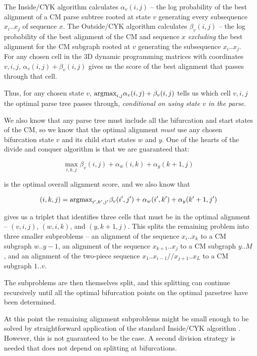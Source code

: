 \documentclass[11pt]{article}
\begin{document}
The Inside/CYK algorithm calculates $\alpha_v(i,j)$ -- the log
probability of the best alignment of a CM parse subtree rooted at
state $v$ generating every subsequence $x_i..x_j$ of sequence $x$.
The Outside/CYK algorithm calculates $\beta_v(i,j)$ -- the log
probability of the best alignment of the CM and sequence $x$
\emph{excluding} the best alignment for the CM subgraph rooted at $v$
generating the subsequence $x_i..x_j$.  For any chosen cell in the 3D
dynamic programming matrices with coordinates $v,i,j$, $\alpha_v(i,j)
+ \beta_v(i,j)$ gives us the score of the best alignment that passes
through that cell. 

Thus, for any chosen state $v$, $\mbox{\rm{argmax}}_{i,j} \alpha_{v}(i,j) +
\beta_{v}(i,j)$ tells us which cell $v,i,j$ the optimal parse tree
passes through, \emph{conditional on using state $v$ in the parse}.

We also know that any parse tree must include all the bifurcation and
start states of the CM, so we know that the optimal alignment
\emph{must} use any chosen bifurcation state $v$ and its child start
states $w$ and $y$. One of the hearts of the divide and conquer
algorithm is that we are guaranteed that:

\[
   \max_{i,k,j} \beta_{v}(i,j) + \alpha_{w}(i,k) + \alpha_{y}(k+1,j)
\]

is the optimal overall alignment score, and we also know that

\[
      (i,k,j) = \mbox{\rm{argmax}}_{i',k',j'}  \beta_{v}(i',j') +
      \alpha_{w}(i',k') + \alpha_{y}(k'+1,j') 
\]

gives us a triplet that identifies three cells that must be in the
optimal alignment -- $(v,i,j)$, $(w,i,k)$, and $(y,k+1,j)$. This
splits the remaining problem into three smaller subproblems -- an
alignment of the sequence $x_{i}..x_{k}$ to a CM subgraph $w..y-1$, an
alignment of the sequence $x_{k+1}..x_{j}$ to a CM subgraph $y..M$,
and an alignment of the two-piece sequence
$x_1..x_{i-1}//x_{j+1}..x_L$ to a CM subgraph $1..v$.

The subproblems are then themselves split, and this splitting can
continue recursively until all the optimal bifurcation points on the
optimal parsetree have been determined.

At this point the remaining alignment subproblems might be small
enough to be solved by straightforward application of the standard
Inside/CYK algorithm . However, this is not guaranteed to be the
case. A second division strategy is needed that does not depend on
splitting at bifurcations.
\end{document}
